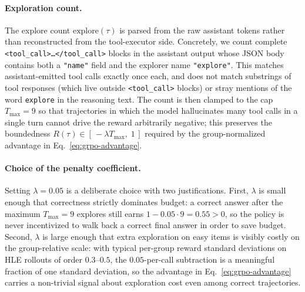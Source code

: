 \paragraph{Exploration count.}
The explore count $\mathrm{explore}(\tau)$ is parsed from the raw assistant tokens rather than reconstructed from the tool-executor side. Concretely, we count complete \texttt{<tool\_call>\ldots</tool\_call>} blocks in the assistant output whose JSON body contains both a \texttt{"name"} field and the explorer name \texttt{"explore"}. This matches assistant-emitted tool calls exactly once each, and does not match substrings of tool responses (which live outside \texttt{<tool\_call>} blocks) or stray mentions of the word \texttt{explore} in the reasoning text. The count is then clamped to the cap $T_{\max}=9$ so that trajectories in which the model hallucinates many tool calls in a single turn cannot drive the reward arbitrarily negative; this preserves the boundedness $R(\tau) \in [\,{-}\lambda T_{\max},\; 1\,]$ required by the group-normalized advantage in Eq.~\eqref{eq:grpo-advantage}.

\paragraph{Choice of the penalty coefficient.}
Setting $\lambda=0.05$ is a deliberate choice with two justifications. First, $\lambda$ is small enough that correctness strictly dominates budget: a correct answer after the maximum $T_{\max}=9$ explores still earns $1 - 0.05\cdot 9 = 0.55 > 0$, so the policy is never incentivized to walk back a correct final answer in order to save budget. Second, $\lambda$ is large enough that extra exploration on easy items is visibly costly on the group-relative scale: with typical per-group reward standard deviations on HLE rollouts of order $0.3$--$0.5$, the $0.05$-per-call subtraction is a meaningful fraction of one standard deviation, so the advantage in Eq.~\eqref{eq:grpo-advantage} carries a non-trivial signal about exploration cost even among correct trajectories.

